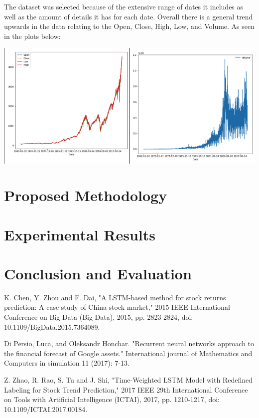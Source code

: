 \documentclass{article}
\begin{document}
The dataset was selected because of the extensive range of dates it includes as well as the amount of details it has for each date. Overall there is a general trend upwards in the data relating to the Open, Close, High, Low, and Volume. As seen in the plots below:
\begin{center}
	\includegraphics[scale=0.4]{p1.png}
\end{center}
\section{Proposed Methodology} 
\section{Experimental Results} 
\section{Conclusion and Evaluation} 

\begin{thebibliography}{9}
K. Chen, Y. Zhou and F. Dai, "A LSTM-based method for stock returns prediction: A case study of China stock market," 2015 IEEE International Conference on Big Data (Big Data), 2015, pp. 2823-2824, doi: 10.1109/BigData.2015.7364089.

Di Persio, Luca, and Oleksandr Honchar. "Recurrent neural networks approach to the financial forecast of Google assets." International journal of Mathematics and Computers in simulation 11 (2017): 7-13.

Z. Zhao, R. Rao, S. Tu and J. Shi, "Time-Weighted LSTM Model with Redefined Labeling for Stock Trend Prediction," 2017 IEEE 29th International Conference on Tools with Artificial Intelligence (ICTAI), 2017, pp. 1210-1217, doi: 10.1109/ICTAI.2017.00184.

\end{thebibliography}
\end{document}
